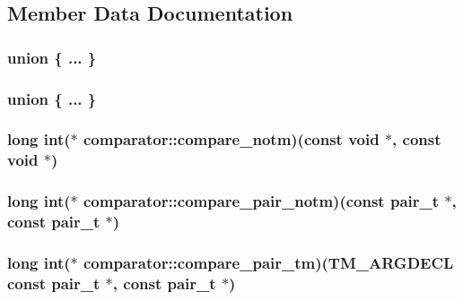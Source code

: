 \subsection{Member Data Documentation}
\hypertarget{structcomparator_ad9c40f2f283a03e40454da138fb34dde}{\subsubsection[{"@21}]{\setlength{\rightskip}{0pt plus 5cm}union \{ ... \} }}\label{structcomparator_ad9c40f2f283a03e40454da138fb34dde}
\hypertarget{structcomparator_a9fb6bf4f7a356f852bb761a86b00217b}{\subsubsection[{"@23}]{\setlength{\rightskip}{0pt plus 5cm}union \{ ... \} }}\label{structcomparator_a9fb6bf4f7a356f852bb761a86b00217b}
\hypertarget{structcomparator_a04331fe4e35ed246b440524c309b9cab}{
\subsubsection[{compare\-\_\-notm}]{\setlength{\rightskip}{0pt plus 5cm}long int($\ast$ comparator\-::compare\-\_\-notm)(const void $\ast$, const void $\ast$)}}\label{structcomparator_a04331fe4e35ed246b440524c309b9cab}
\hypertarget{structcomparator_a3712f9c1314343454595ff27c4723207}{
\subsubsection[{compare\-\_\-pair\-\_\-notm}]{\setlength{\rightskip}{0pt plus 5cm}long int($\ast$ comparator\-::compare\-\_\-pair\-\_\-notm)(const {\bf pair\-\_\-t} $\ast$, const {\bf pair\-\_\-t} $\ast$)}}\label{structcomparator_a3712f9c1314343454595ff27c4723207}
\hypertarget{structcomparator_a5f55648532ae36dc726ded03479d7eb9}{
\subsubsection[{compare\-\_\-pair\-\_\-tm}]{ long int($\ast$ comparator\-::compare\-\_\-pair\-\_\-tm)({\bf T\-M\-\_\-\-A\-R\-G\-D\-E\-C\-L} const {\bf pair\-\_\-t} $\ast$, const {\bf pair\-\_\-t} $\ast$)}}\label{structcomparator_a5f55648532ae36dc726ded03479d7eb9}
